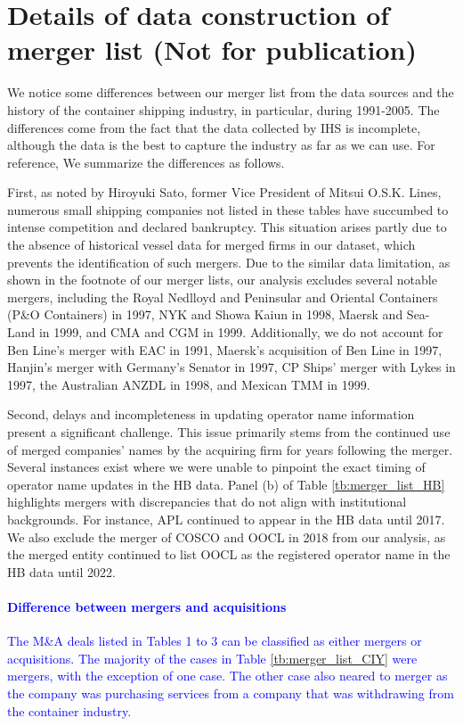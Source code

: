 \documentclass[10pt]{article}
\begin{document}



\newpage
\appendix
\section{Details of data construction of merger list (Not for publication)}\label{sec:details_of_data_construction}

We notice some differences between our merger list from the data sources and the history of the container shipping industry, in particular, during 1991-2005. 
The differences come from the fact that the data collected by IHS is incomplete, although the data is the best to capture the industry as far as we can use. For reference, We summarize the differences as follows. 

First, as noted by Hiroyuki Sato, former Vice President of Mitsui O.S.K. Lines, numerous small shipping companies not listed in these tables have succumbed to intense competition and declared bankruptcy. This situation arises partly due to the absence of historical vessel data for merged firms in our dataset, which prevents the identification of such mergers. Due to the similar data limitation, as shown in the footnote of our merger lists, our analysis excludes several notable mergers, including the Royal Nedlloyd and Peninsular and Oriental Containers (P\&O Containers) in 1997, NYK and Showa Kaiun in 1998, Maersk and Sea-Land in 1999, and CMA and CGM in 1999. Additionally, we do not account for Ben Line's merger with EAC in 1991, Maersk's acquisition of Ben Line in 1997, Hanjin's merger with Germany's Senator in 1997, CP Ships' merger with Lykes in 1997, the Australian ANZDL in 1998, and Mexican TMM in 1999.

Second, delays and incompleteness in updating operator name information present a significant challenge. This issue primarily stems from the continued use of merged companies' names by the acquiring firm for years following the merger. Several instances exist where we were unable to pinpoint the exact timing of operator name updates in the HB data. Panel (b) of Table \ref{tb:merger_list_HB} highlights mergers with discrepancies that do not align with institutional backgrounds. For instance, APL continued to appear in the HB data until 2017. We also exclude the merger of COSCO and OOCL in 2018 from our analysis, as the merged entity continued to list OOCL as the registered operator name in the HB data until 2022.

\textcolor{blue}{
\paragraph{Difference between mergers and acquisitions}The M&A deals listed in Tables 1 to 3 can be classified as either mergers or acquisitions. The majority of the cases in Table \ref{tb:merger_list_CIY} were mergers, with the exception of one case. The other case also neared to merger as the company was purchasing services from a company that was withdrawing from the container industry.}
\end{document}
